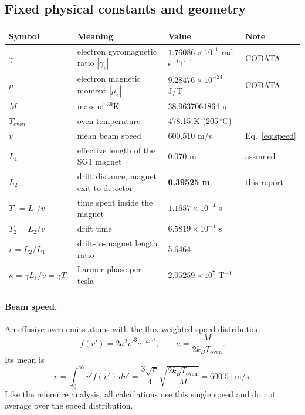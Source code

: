 \documentclass[11pt,a4paper]{article}
\begin{document}
\subsection{Fixed physical constants and geometry}

\begin{center}
\small\begin{tabular}{llll}
\toprule
Symbol & Meaning & Value & Note\\
\midrule
$\gamma$ & electron gyromagnetic ratio $|\gamma_e|$ & $1.76086\times10^{11}$ rad\,s$^{-1}$T$^{-1}$ & CODATA\\
$\mu$    & electron magnetic moment $|\mu_e|$ & $9.28476\times10^{-24}$ J/T & CODATA\\
$M$      & mass of $^{39}$K & 38.9637064864 u & \\
$T_\text{oven}$ & oven temperature & 478.15 K (205\,$^\circ$C) & \\
$v$      & mean beam speed & 600.510 m/s & Eq.~\eqref{eq:speed}\\
$L_1$    & effective length of the SG1 magnet & 0.070 m & assumed\\
$L_2$    & drift distance, magnet exit to detector & \textbf{0.39525 m} & this report\\
\midrule
$T_1 = L_1/v$ & time spent inside the magnet & $1.1657\times10^{-4}$ s & \\
$T_2 = L_2/v$ & drift time & $6.5819\times10^{-4}$ s & \\
$r = L_2/L_1$ & drift-to-magnet length ratio & 5.6464 & \\
$\kappa = \gamma L_1/v = \gamma T_1$ & Larmor phase per tesla & $2.05259\times10^{7}$ T$^{-1}$ & \\
\bottomrule
\end{tabular}
\end{center}

\paragraph{Beam speed.} An effusive oven emits atoms with the flux-weighted speed distribution
\begin{equation}
f(v') = 2a^2 v'^3 e^{-a v'^2}, \qquad a = \frac{M}{2k_B T_\text{oven}} .
\end{equation}
Its mean is
\begin{equation}
v = \int_0^\infty v' f(v')\,dv' = \frac{3\sqrt{\pi}}{4}\sqrt{\frac{2k_B T_\text{oven}}{M}} = 600.51\ \text{m/s}.
\label{eq:speed}
\end{equation}
Like the reference analysis, all calculations use this single speed and do not average over the speed distribution.
\end{document}
